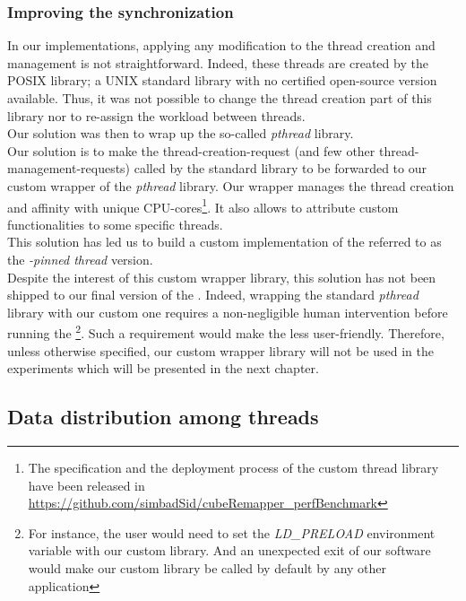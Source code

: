 		\subsubsection{Improving the \notationaioShort\space synchronization}\label{subsubsection:pthreadWrapper}
			In our implementations, applying any modification to the thread creation and management is not straightforward.   Indeed, these threads are created by the POSIX \notationaio\space library; a UNIX standard library with no certified open-source version available.   Thus, it was not possible to change the thread creation part of this library nor to re-assign the workload between threads.\\
			Our solution was then to wrap up the so-called \emph{pthread} library.\\

			Our solution is to make the thread-creation-request (and few other thread-management-requests) called by the standard \notationaio\space library to be forwarded to our custom wrapper of the \emph{pthread} library.   Our wrapper manages the thread creation and affinity with unique CPU-cores\footnote{The specification and the deployment process of the custom thread library have been released in \href{https://github.com/simbadSid/cubeRemapper\_perfBenchmark}{https://github.com/simbadSid/cubeRemapper\_perfBenchmark}}.   It also allows to attribute custom functionalities to some specific threads.\\

			This solution has led us to build a custom implementation of the \toolTargetSoftware\space referred to as the \emph{\notationaio-pinned thread} version.\\

			Despite the interest of this custom wrapper library, this solution has not been shipped to our final version of the \toolTargetSoftware.   Indeed, wrapping the standard \emph{pthread} library with our custom one requires a non-negligible human intervention before running the \toolTargetSoftware\footnote{For instance, the user would need to set the \emph{LD\_PRELOAD} environment variable with our custom library.   And an unexpected exit of our software would make our custom library be called by default by any other application}.   Such a requirement would make the \toolTargetSoftware\space less user-friendly.   Therefore, unless otherwise specified, our custom wrapper library will not be used in the experiments which will be presented in the next chapter.


	\subsection{Data distribution among threads}\label{subsection:dataDistribution}
